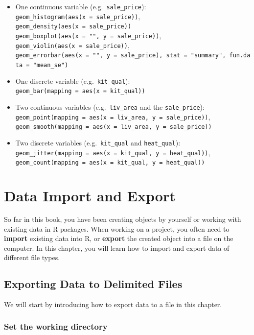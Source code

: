 \documentclass[
]{book}
\providecommand{\tightlist}{%
  \setlength{\itemsep}{0pt}\setlength{\parskip}{0pt}}
\begin{document}
\begin{itemize}
\tightlist
\item
  One continuous variable (e.g.~\texttt{sale\_price}):
  \texttt{geom\_histogram(aes(x\ =\ sale\_price))}, \texttt{geom\_density(aes(x\ =\ sale\_price))}
  \texttt{geom\_boxplot(aes(x\ =\ "",\ y\ =\ sale\_price))}, \texttt{geom\_violin(aes(x\ =\ sale\_price))}, \texttt{geom\_errorbar(aes(x\ =\ "",\ y\ =\ sale\_price),\ stat\ =\ "summary",\ fun.data\ =\ "mean\_se")}
\item
  One discrete variable (e.g.~\texttt{kit\_qual}):
  \texttt{geom\_bar(mapping\ =\ aes(x\ =\ kit\_qual))}
\item
  Two continuous variables (e.g.~\texttt{liv\_area} and the \texttt{sale\_price}):
  \texttt{geom\_point(mapping\ =\ aes(x\ =\ liv\_area,\ y\ =\ sale\_price))},
  \texttt{geom\_smooth(mapping\ =\ aes(x\ =\ liv\_area,\ y\ =\ sale\_price))}
\item
  Two discrete variables (e.g.~\texttt{kit\_qual} and \texttt{heat\_qual}):
  \texttt{geom\_jitter(mapping\ =\ aes(x\ =\ kit\_qual,\ y\ =\ heat\_qual))},
  \texttt{geom\_count(mapping\ =\ aes(x\ =\ kit\_qual,\ y\ =\ heat\_qual))}
\end{itemize}

\hypertarget{import-export}{%
\chapter{Data Import and Export}\label{import-export}}

So far in this book, you have been creating objects by yourself or working with existing data in R packages. When working on a project, you often need to \textbf{import} existing data into R, or \textbf{export} the created object into a file on the computer. In this chapter, you will learn how to import and export data of different file types.

\hypertarget{export-data}{%
\section{Exporting Data to Delimited Files}\label{export-data}}

We will start by introducing how to export data to a file in this chapter.

\hypertarget{set-the-working-directory}{%
\subsection{Set the working directory}\label{set-the-working-directory}}
\end{document}

